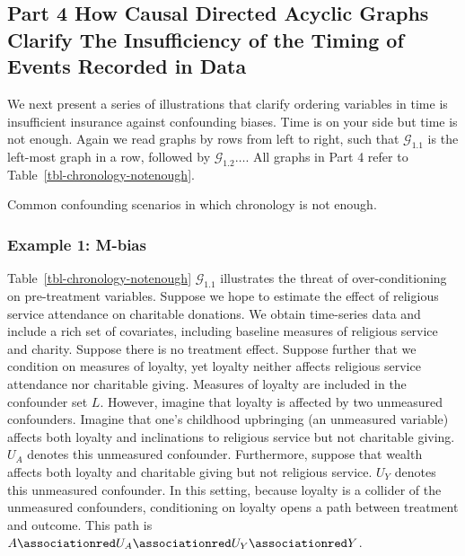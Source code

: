 \documentclass[
  single column]{article}
\begin{document}
\subsection{Part 4 How Causal Directed Acyclic Graphs Clarify The
Insufficiency of the Timing of Events Recorded in Data}\label{id-sec-4}

We next present a series of illustrations that clarify ordering
variables in time is insufficient insurance against confounding biases.
Time is on your side but time is not enough. Again we read graphs by
rows from left to right, such that \(\mathcal{G}_{1.1}\) is the
left-most graph in a row, followed by \(\mathcal{G}_{1.2} \ldots\). All
graphs in Part 4 refer to Table~\ref{tbl-chronology-notenough}.

\begin{table}

\caption{\label{tbl-chronology-notenough}Common confounding scenarios in
which chronology is not enough.}

\centering{

\terminologychronologicalhygeineNOTENOUGH

}

\end{table}%

\subsubsection{Example 1: M-bias}\label{example-1-m-bias}

Table~\ref{tbl-chronology-notenough} \(\mathcal{G}_{1.1}\) illustrates
the threat of over-conditioning on pre-treatment variables. Suppose we
hope to estimate the effect of religious service attendance on
charitable donations. We obtain time-series data and include a rich set
of covariates, including baseline measures of religious service and
charity. Suppose there is no treatment effect. Suppose further that we
condition on measures of loyalty, yet loyalty neither affects religious
service attendance nor charitable giving. Measures of loyalty are
included in the confounder set \(L\). However, imagine that loyalty is
affected by two unmeasured confounders. Imagine that one's childhood
upbringing (an unmeasured variable) affects both loyalty and
inclinations to religious service but not charitable giving. \(U_A\)
denotes this unmeasured confounder. Furthermore, suppose that wealth
affects both loyalty and charitable giving but not religious service.
\(U_Y\) denotes this unmeasured confounder. In this setting, because
loyalty is a collider of the unmeasured confounders, conditioning on
loyalty opens a path between treatment and outcome. This path is
\(A \associationred U_A \associationred U_Y \associationred Y\).
\end{document}
